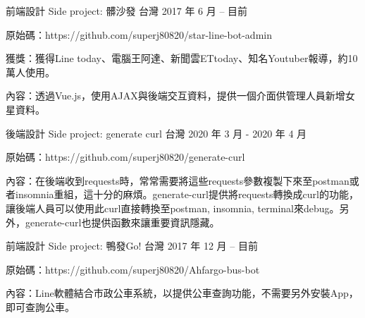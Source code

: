 \begin{cventries}
{\begin{cvitems}
      \end{cvitems}
    }
  \cventry
    {前端設計} %
    {Side project: 髒沙發} %
    {台灣} %
    {2017 年 6 月 – 目前} %
    {
      \begin{cvitems} %
        \item {原始碼：https://github.com/superj80820/star-line-bot-admin}
        \item {獲獎：獲得Line today、電腦王阿達、新聞雲ETtoday、知名Youtuber報導，約10萬人使用。}
        \item {內容：透過Vue.js，使用AJAX與後端交互資料，提供一個介面供管理人員新增女星資料。}
      \end{cvitems}
    }
  \cventry
    {後端設計} %
    {Side project: generate curl} %
    {台灣} %
    {2020 年 3 月 - 2020 年 4 月} %
    {
      \begin{cvitems} %
        \item {原始碼：https://github.com/superj80820/generate-curl}
        \item {內容：在後端收到requests時，常常需要將這些requests參數複製下來至postman或者insomnia重組，這十分的麻煩。generate-curl提供將requests轉換成curl的功能，讓後端人員可以使用此curl直接轉換至postman, insomnia, terminal來debug。另外，generate-curl也提供函數來讓重要資訊隱藏。}
      \end{cvitems}
    }
  \cventry
    {前端設計} %
    {Side project: 鴨發Go!} %
    {台灣} %
    {2017 年 12 月 – 目前} %
    {
      \begin{cvitems} %
        \item {原始碼：https://github.com/superj80820/Ahfargo-bus-bot}
        \item {內容：Line軟體結合市政公車系統，以提供公車查詢功能，不需要另外安裝App，即可查詢公車。}
      \end{cvitems}
    }

\end{cventries}
